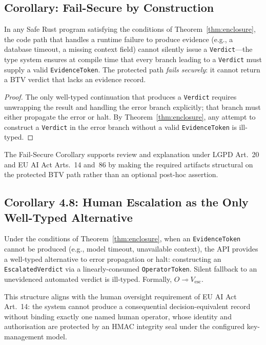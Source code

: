 \subsection{Corollary: Fail-Secure by Construction}
\label{sec:corollary}

\begin{corollary}
\label{cor:failsecure}
In any Safe Rust program satisfying the conditions of
Theorem~\ref{thm:enclosure}, the code path that handles a runtime
failure to produce evidence (e.g., a database timeout, a missing
context field) cannot silently issue a \texttt{Verdict}---the type
system ensures at compile time that every branch leading to a
\texttt{Verdict} must supply a valid \texttt{EvidenceToken}.
The protected path \emph{fails securely}: it cannot return a BTV verdict
that lacks an evidence record.
\end{corollary}

\begin{proof}
The only well-typed continuation that produces a \texttt{Verdict}
requires unwrapping the result and handling the error branch
explicitly; that branch must either propagate the error or halt.  By
Theorem~\ref{thm:enclosure}, any attempt to construct a
\texttt{Verdict} in the error branch without a valid
\texttt{EvidenceToken} is ill-typed.
\end{proof}

The Fail-Secure Corollary supports review and explanation under
LGPD Art.~20 and EU AI Act Arts.~14 and~86 by making the required
artifacts structural on the protected BTV path rather than an optional
post-hoc assertion.

\subsection{Corollary 4.8: Human Escalation as the Only Well-Typed Alternative}
\label{sec:escalated}

\begin{corollary}
\label{cor:escalated}
Under the conditions of Theorem~\ref{thm:enclosure}, when an
\texttt{EvidenceToken} cannot be produced (e.g., model timeout,
unavailable context), the API provides a well-typed alternative to error
propagation or halt: constructing an \texttt{EscalatedVerdict}
via a linearly-consumed \texttt{OperatorToken}.
Silent fallback to an unevidenced automated verdict is ill-typed.
Formally, $O \multimap V_{\mathrm{esc}}$.

This structure aligns with the human oversight requirement of
EU AI Act Art.~14: the system cannot produce a consequential
decision-equivalent record without binding exactly one named
human operator, whose identity and authorisation are protected by an
HMAC integrity seal under the configured key-management model.
\end{corollary}

